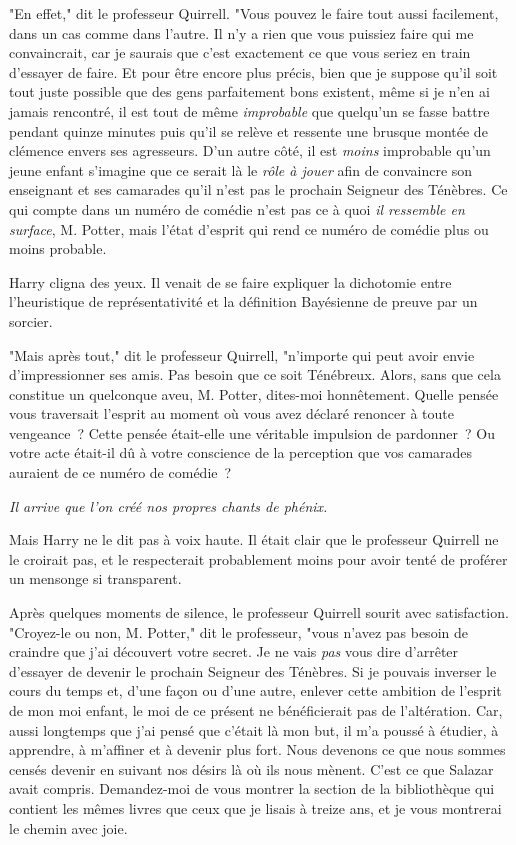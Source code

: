 "En effet," dit le professeur Quirrell. "Vous pouvez le faire tout aussi facilement, dans un cas comme dans l'autre. Il n'y a rien que vous puissiez faire qui me convaincrait, car je saurais que c'est exactement ce que vous seriez en train d'essayer de faire. Et pour être encore plus précis, bien que je suppose qu'il soit tout juste possible que des gens parfaitement bons existent, même si je n'en ai jamais rencontré, il est tout de même \emph{improbable} que quelqu'un se fasse battre pendant quinze minutes puis qu'il se relève et ressente une brusque montée de clémence envers ses agresseurs. D'un autre côté, il est \emph{moins} improbable qu'un jeune enfant s'imagine que ce serait là le \emph{rôle à jouer} afin de convaincre son enseignant et ses camarades qu'il n'est pas le prochain Seigneur des Ténèbres. Ce qui compte dans un numéro de comédie n'est pas ce à quoi \emph{il ressemble en surface}, M. Potter, mais l'état d'esprit qui rend ce numéro de comédie plus ou moins probable.

Harry cligna des yeux. Il venait de se faire expliquer la dichotomie entre l'heuristique de représentativité et la définition Bayésienne de preuve par un sorcier.

"Mais après tout," dit le professeur Quirrell, "n'importe qui peut avoir envie d'impressionner ses amis. Pas besoin que ce soit Ténébreux. Alors, sans que cela constitue un quelconque aveu, M. Potter, dites-moi honnêtement. Quelle pensée vous traversait l'esprit au moment où vous avez déclaré renoncer à toute vengeance~? Cette pensée était-elle une véritable impulsion de pardonner~? Ou votre acte était-il dû à votre conscience de la perception que vos camarades auraient de ce numéro de comédie~?

\emph{Il arrive que l'on créé nos propres chants de phénix.}

Mais Harry ne le dit pas à voix haute. Il était clair que le professeur Quirrell ne le croirait pas, et le respecterait probablement moins pour avoir tenté de proférer un mensonge si transparent.

Après quelques moments de silence, le professeur Quirrell sourit avec satisfaction. "Croyez-le ou non, M. Potter," dit le professeur, "vous n'avez pas besoin de craindre que j'ai découvert votre secret. Je ne vais \emph{pas} vous dire d'arrêter d'essayer de devenir le prochain Seigneur des Ténèbres. Si je pouvais inverser le cours du temps et, d'une façon ou d'une autre, enlever cette ambition de l'esprit de mon moi enfant, le moi de ce présent ne bénéficierait pas de l'altération. Car, aussi longtemps que j'ai pensé que c'était là mon but, il m'a poussé à étudier, à apprendre, à m'affiner et à devenir plus fort. Nous devenons ce que nous sommes censés devenir en suivant nos désirs là où ils nous mènent. C'est ce que Salazar avait compris. Demandez-moi de vous montrer la section de la bibliothèque qui contient les mêmes livres que ceux que je lisais à treize ans, et je vous montrerai le chemin avec joie.

